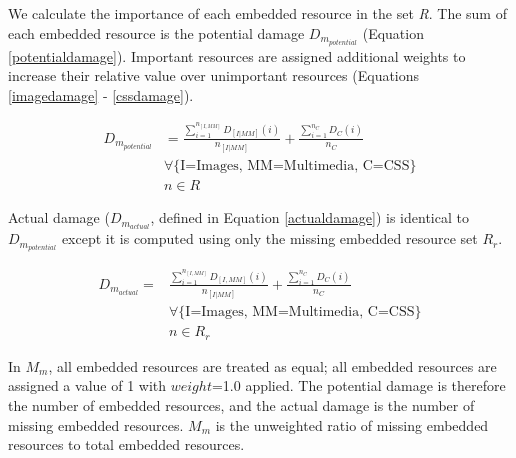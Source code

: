 We calculate the importance of each embedded resource in the set \emph{R}. The sum of each embedded resource is the potential damage \emph{$D_{m_{potential}}$} (Equation \ref{potentialdamage}). Important resources are assigned additional weights to increase their relative value over unimportant resources (Equations \ref{imagedamage} - \ref{cssdamage}).

\begin{equation}
\label{potentialdamage}
\begin{split}
D_{m_{potential}}& = \frac{\sum_{i=1}^{n_{[I,MM]}} D_{[I|MM]}(i)}{n_{[I|MM]}} +\frac{\sum_{i=1}^{n_C} D_C(i)}{n_C} %
\\&\forall\{\text{I=Images, MM=Multimedia, C=CSS}\}\\& n \in R
\end{split}
\end{equation}

Actual damage ($D_{m_{actual}}$, defined in Equation \ref{actualdamage}) is identical to $D_{m_{potential}}$ except it is computed using only the missing embedded resource set \emph{$R_r$}. %

\begin{equation}
\label{actualdamage}
\begin{split}
D_{m_{actual}} =& \frac{\sum_{i=1}^{n_{[I,MM]}} D_{[I,MM]}(i)}{n_{[I|MM]}} + \frac{\sum_{i=1}^{n_C} D_C(i)}{n_C} %
\\&\forall\{\text{I=Images, MM=Multimedia, C=CSS}\} \\&n \in R_r
\end{split}
\end{equation}


In $M_m$, all embedded resources are treated as equal; all embedded resources are assigned a value of 1 with $weight$=1.0 applied. The potential damage is therefore the number of embedded resources, and the actual damage is the number of missing embedded resources. $M_m$ is the unweighted ratio of missing embedded resources to total embedded resources.

